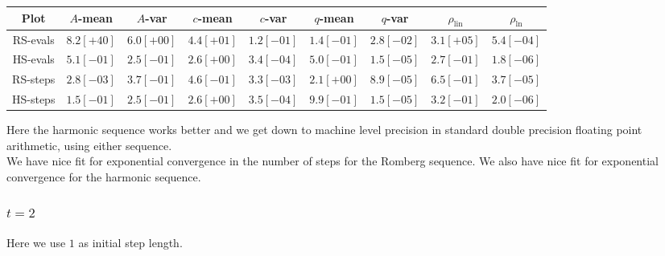 \begin{table}[H]
    \centering
    \small
    \begin{tabular}{c||c|c|c|c|c|c|c|c}
Plot & \(A\)-mean & \(A\)-var & \(c\)-mean & \(c\)-var & \(q\)-mean & \(q\)-var & \(\rho_{\operatorname{lin}}\) & \(\rho_{\ln}\)\\\hline
\rowcolor{red}
RS-evals & \(8.2[+40]\) & \(6.0[+00]\) & \(4.4[+01]\) & \(1.2[-01]\) & \(1.4[-01]\) & \(2.8[-02]\) & \(3.1[+05]\) & \(5.4[-04]\) \\
\rowcolor{green}
HS-evals & \(5.1[-01]\) & \(2.5[-01]\) & \(2.6[+00]\) & \(3.4[-04]\) & \(5.0[-01]\) & \(1.5[-05]\) & \(2.7[-01]\) & \(1.8[-06]\) \\
\rowcolor{green}
RS-steps & \(2.8[-03]\) & \(3.7[-01]\) & \(4.6[-01]\) & \(3.3[-03]\) & \(2.1[+00]\) & \(8.9[-05]\) & \(6.5[-01]\) & \(3.7[-05]\) \\
\rowcolor{green}
HS-steps & \(1.5[-01]\) & \(2.5[-01]\) & \(2.6[+00]\) & \(3.5[-04]\) & \(9.9[-01]\) & \(1.5[-05]\) & \(3.2[-01]\) & \(2.0[-06]\) \\
    \end{tabular}
    \label{tab:my_label}
\end{table}

Here the harmonic sequence works better and we get down to machine level precision in standard double precision floating point arithmetic, using either sequence.\\

We have nice fit for exponential convergence in the number of steps for the Romberg sequence. We also have nice fit for exponential convergence for the harmonic sequence.

\subsubsection{\(t = 2\)}

Here we use \(1\) as initial step length.

